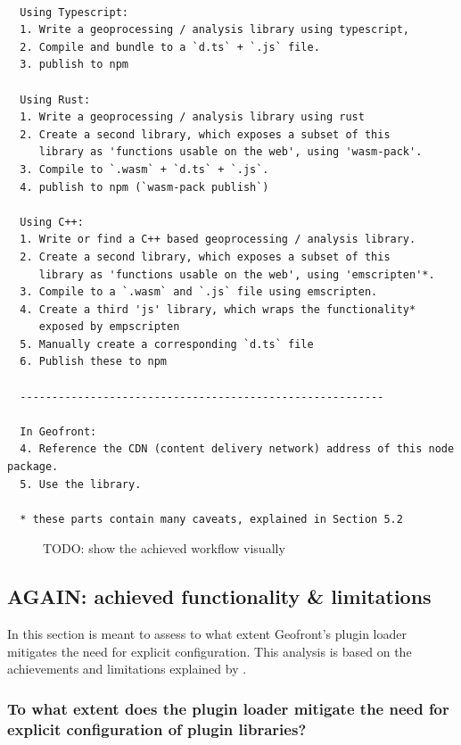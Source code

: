 \begin{lstlisting}
  
  Using Typescript: 
  1. Write a geoprocessing / analysis library using typescript, 
  2. Compile and bundle to a `d.ts` + `.js` file.
  3. publish to npm 

  Using Rust: 
  1. Write a geoprocessing / analysis library using rust
  2. Create a second library, which exposes a subset of this 
     library as 'functions usable on the web', using 'wasm-pack'.
  3. Compile to `.wasm` + `d.ts` + `.js`.
  4. publish to npm (`wasm-pack publish`)
  
  Using C++: 
  1. Write or find a C++ based geoprocessing / analysis library. 
  2. Create a second library, which exposes a subset of this 
     library as 'functions usable on the web', using 'emscripten'*.
  3. Compile to a `.wasm` and `.js` file using emscripten.
  4. Create a third 'js' library, which wraps the functionality* 
     exposed by empscripten
  5. Manually create a corresponding `d.ts` file
  6. Publish these to npm 

  ---------------------------------------------------------

  In Geofront: 
  4. Reference the CDN (content delivery network) address of this node package. 
  5. Use the library.

  * these parts contain many caveats, explained in Section 5.2

\end{lstlisting}

\begin{figure}
  \centering
  \graphicspath{ {../../assets/diagrams/} }
  \caption[]{TODO: show the achieved workflow visually}
  \label{fig:todo-more-images}
\end{figure}

\subsection{AGAIN: achieved functionality \& limitations}
\label{sec:analyses:loading}

In this section is meant to assess to what extent Geofront's plugin loader mitigates the need for explicit configuration.
This analysis is based on the achievements and limitations explained by .

\subsubsection*{To what extent does the plugin loader mitigate the need for explicit configuration of plugin libraries?}

